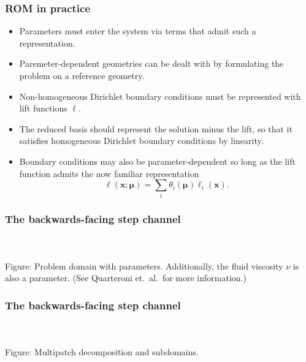 \documentclass{beamer}
\begin{document}
\begin{frame}
  \frametitle{ROM in practice}
  \begin{itemize}
  \item Parameters must enter the system via terms that admit such a
    representation.
  \item Paremeter-dependent geometries can be dealt with by formulating the
    problem on a reference geometry.
  \item Non-homogeneous Dirichlet boundary conditions must be represented with
    lift functions $\bm \ell$.
  \item The reduced basis should represent the solution minus the lift, so that
    it satisfies homogeneous Dirichlet boundary conditions by linearity.
  \item Boundary conditions may also be parameter-dependent so long as the lift
    function admits the now familiar representation
    \[
      \bm \ell(\bm x; \bm \mu) =
      \sum_i \theta_i(\bm \mu) \bm \ell_i(\bm x).
    \]
  \end{itemize}
\end{frame}

\begin{frame}
  \frametitle{The backwards-facing step channel}
  \begin{center}
    \\~\\
    Figure: Problem domain with parameters. Additionally, the fluid viscosity
    $\nu$ is also a parameter. (See Quarteroni et.~al.~for more information.)
  \end{center}
\end{frame}

\begin{frame}
  \frametitle{The backwards-facing step channel}
  \begin{center}
    \\~\\
    Figure: Multipatch decomposition and subdomains.
  \end{center}
\end{frame}
\end{document}
